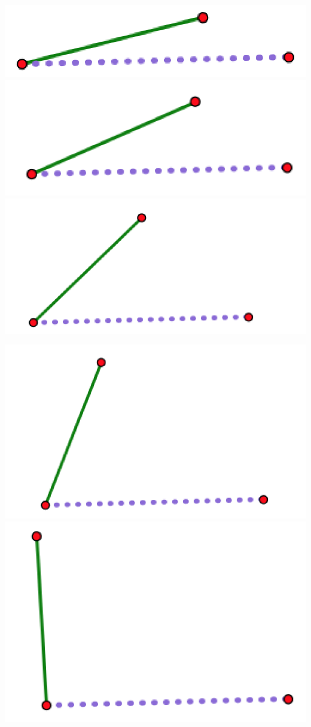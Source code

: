 \documentclass[12pt, reqno]{amsart}
\theoremstyle{remark}
\theoremstyle{definition}
\numberwithin{equation}{section}  %
\begin{document}
\begin{center}
\includegraphics[scale = .4]{open1}
 \includegraphics[scale = .4]{open2}
 \includegraphics[scale = .4]{open3}

\includegraphics[scale = .4]{open4}
\quad
\includegraphics[scale = .4]{open5}


\end{center}
\end{document}
